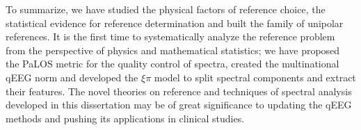 \begin{englishabstract}
To summarize, we have studied the physical factors of reference choice, the statistical evidence for reference determination and built the family of unipolar references. It is the first time to systematically analyze the reference problem from the perspective of physics and mathematical statistics; we have proposed the PaLOS metric for the quality control of spectra, created the multinational qEEG norm and developed the $\xi\pi$ model to split spectral components and extract their features. The novel theories on reference and techniques of spectral analysis developed in this dissertation may be of great significance to updating the qEEG methods and pushing its applications in clinical studies.

\end{englishabstract}